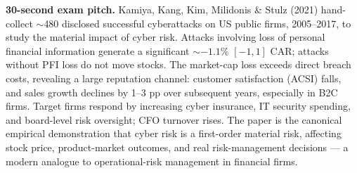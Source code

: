 \documentclass[11pt]{article}
\begin{document}
\begin{keybox}
\textbf{30-second exam pitch.} Kamiya, Kang, Kim, Milidonis \& Stulz (2021) hand-collect $\sim$480 disclosed successful cyberattacks on US public firms, 2005--2017, to study the material impact of cyber risk. Attacks involving loss of personal financial information generate a significant $\sim -1.1$\% $[-1,1]$ CAR; attacks without PFI loss do not move stocks. The market-cap loss exceeds direct breach costs, revealing a large reputation channel: customer satisfaction (ACSI) falls, and sales growth declines by 1--3 pp over subsequent years, especially in B2C firms. Target firms respond by increasing cyber insurance, IT security spending, and board-level risk oversight; CFO turnover rises. The paper is the canonical empirical demonstration that cyber risk is a first-order material risk, affecting stock price, product-market outcomes, and real risk-management decisions --- a modern analogue to operational-risk management in financial firms.
\end{keybox}
\end{document}
